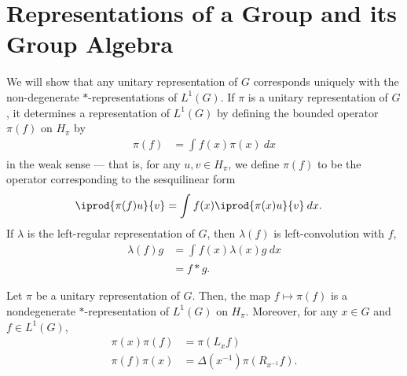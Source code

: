 \documentclass[12pt]{mypackage}
\begin{document}
\section{Representations of a Group and its Group Algebra}%
We will show that any unitary representation of $G$ corresponds uniquely with the non-degenerate $\ast$-representations of $L^1(G)$. If $\pi$ is a unitary representation of $G$, it determines a representation of $L^1(G)$ by defining the bounded operator $\pi(f)$ on $H_{\pi}$ by
\begin{align*}
  \pi(f) &= \int_{}^{} f(x)\pi(x)\:dx
\end{align*}
in the weak sense --- that is, for any $u,v\in H_{\pi}$, we define $\pi(f)$ to be the operator corresponding to the sesquilinear form
\begin{align*}
  \iprod{\pi(f)u}{v} &= \int_{}^{} f(x) \iprod{\pi(x)u}{v}\:dx.
\end{align*}
If $\lambda$ is the left-regular representation of $G$, then $\lambda(f)$ is left-convolution with $f$,
\begin{align*}
  \lambda(f)g &= \int_{}^{} f(x)\lambda(x)g\:dx\\
              &= f\ast g.
\end{align*}
\begin{theorem}
  Let $\pi$ be a unitary representation of $G$. Then, the map $f\mapsto \pi(f)$ is a nondegenerate $\ast$-representation of $L^1(G)$ on $H_{\pi}$. Moreover, for any $x\in G$ and $f\in L^1(G)$,
  \begin{align*}
    \pi(x)\pi(f) &= \pi\left( L_xf \right)\\
    \pi(f)\pi(x) &= \Delta\left( x^{-1} \right)\pi\left( R_{x^{-1}}f \right).
  \end{align*}
\end{theorem}
\end{document}

